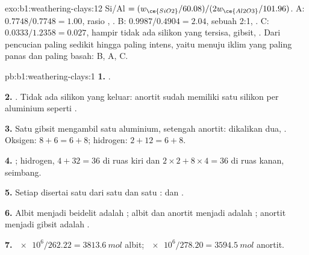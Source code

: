 \begin{solution}{exo:b1:weathering-clays:12}
Si/Al $= (w_{\ce{SiO2}}/60.08)/(2w_{\ce{Al2O3}}/101.96)$. A: $0.7748/0.7748 =
1.00$, rasio , . B: $0.9987/0.4904 = 2.04$, sebuah  2:1, . C: $0.0333/1.2358 = 0.027$, hampir tidak ada
silikon yang tersisa, gibsit, . Dari pencucian paling sedikit hingga
paling intens, yaitu menuju iklim yang paling panas dan paling basah: B, A, C.
\end{solution}

\begin{solution}{pb:b1:weathering-clays:1}
\textbf{1.} .

\textbf{2.} . Tidak ada silikon
yang keluar: anortit sudah memiliki satu silikon per aluminium seperti .

\textbf{3.} Satu gibsit mengambil satu aluminium, setengah anortit: dikalikan dua,
. Oksigen:
$8 + 6 = 6 + 8$; hidrogen: $2 + 12 = 6 + 8$.

\textbf{4.} ; %
hidrogen, $4 + 32 = 36$ di ruas kiri dan $2\times2 + 8\times4 = 36$ di
ruas kanan, seimbang.

\textbf{5.} Setiap  disertai satu  dari satu  dan satu
:
dan .

\textbf{6.} Albit menjadi beidelit adalah ; albit dan anortit menjadi
 adalah ; anortit menjadi gibsit adalah .

\textbf{7.} $\num{e6}/262.22 = \qty{3813.6}{mol}$ albit;
$\num{e6}/278.20 = \qty{3594.5}{mol}$ anortit.


\end{solution}
